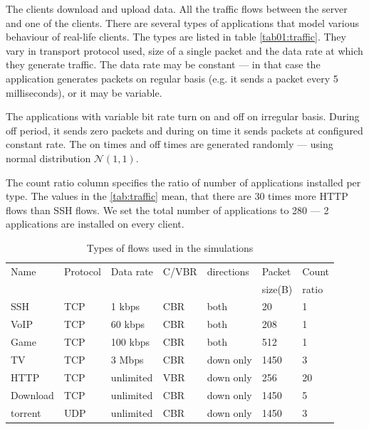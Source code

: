 The clients download and upload data. All the traffic flows between the server and one of the clients. There are several types of applications that model various behaviour of real-life clients. The types are listed in table \ref{tab01:traffic}. They vary in transport protocol used, size of a single packet and the data rate at which they generate traffic. The data rate may be constant --- in that case the application generates packets on regular basis (e.g. it sends a packet every 5 milliseconds), or it may be variable.

The applications with variable bit rate turn on and off on irregular basis. During off period, it sends zero packets and during on time it sends packets at configured constant rate. The on times and off times are generated randomly --- using normal distribution $\mathcal{N}(1,1)$.

The count ratio column specifies the ratio of number of applications installed per type. The values in the \autoref{tab:traffic} mean, that there are 30 times more HTTP flows than SSH flows. We set the total number of applications to 280 --- 2 applications are installed on every client. 

\begin{table}
	\caption{Types of flows used in the simulations}
	\label{tab:traffic}
	\centering
	
	\begin{tabular}{@{}lllllll@{}}
		\toprule
		Name     & Protocol & Data rate & C/VBR & directions & Packet  & Count \\
		         &          &           &       &            & size(B) & ratio \\ \midrule
		SSH      & TCP      & 1 kbps    & CBR   & both       & 20      & 1     \\
		VoIP     & TCP      & 60 kbps   & CBR   & both       & 208     & 1     \\
		Game     & TCP      & 100 kbps  & CBR   & both       & 512     & 1     \\
		TV       & TCP      & 3 Mbps    & CBR   & down only  & 1450    & 3     \\
		HTTP     & TCP      & unlimited & VBR   & down only  & 256     & 20    \\
		Download & TCP      & unlimited & CBR   & down only  & 1450    & 5     \\
		torrent  & UDP      & unlimited & CBR   & down only  & 1450    & 3     \\ \bottomrule
	\end{tabular}
\end{table}



